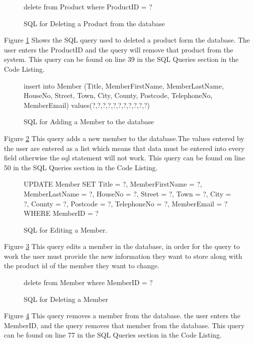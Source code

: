 \begin{figure}[H]
	 \caption{SQL for Deleting a Product from the database} \label{fig:delete-product-sql}
\begin{sql} 
delete from Product where ProductID = ?
\end{sql}
\end{figure}
Figure \ref{fig:delete-product-sql} Shows the SQL query used to deleted a product form the database. The user enters the ProductID and the query will remove that product from the system. This query can be found on line 39 in the SQL Queries section in the Code Listing.

\begin{figure}[H]
	 \caption{SQL for Adding a Member to the database} \label{fig:add-member-sql}
\begin{sql} 
insert into Member (Title, MemberFirstName, MemberLastName, HouseNo, Street, Town, City, County, Postcode, TelephoneNo, MemberEmail) values(?,?,?,?,?,?,?,?,?,?,?)
 \end{sql}
\end{figure}
Figure \ref{fig:add-member-sql} This query adds a new member to the database.The values entered by the user are entered as a list which means that data must be entered into every field otherwise the sql statement will not work.  This query can be found on line 50 in the SQL Queries section in the Code Listing.

\begin{figure}[H]
	 \caption{SQL for Editing a Member.} \label{fig:edit-member-sql}
\begin{sql} 
UPDATE Member SET Title = ?,
                                   MemberFirstName = ?,
                                   MemberLastName = ?,
                                   HouseNo = ?,
                                   Street = ?,
                                   Town = ?,
                                   City = ?,
                                   County = ?,
                                   Postcode = ?,
                                   TelephoneNo = ?,
                                   MemberEmail = ?
                                   WHERE MemberID = ?
\end{sql}
\end{figure}
Figure \ref{fig:edit-member-sql} This query edits a member in the database, in order for the query to work the user must provide the new information they want to store along with the product id of the member they want to change.


\begin{figure}[H]
	 \caption{SQL for Deleting a Member} \label{fig:delete-member-sql}
\begin{sql}
delete from Member where MemberID = ?
\end{sql}
\end{figure}
Figure \ref{fig:delete-member-sql} This query removes a member from the database. the user enters the MemberID, and the query removes that member from the database. This query can be found on line 77 in the SQL Queries section in the Code Listing.


